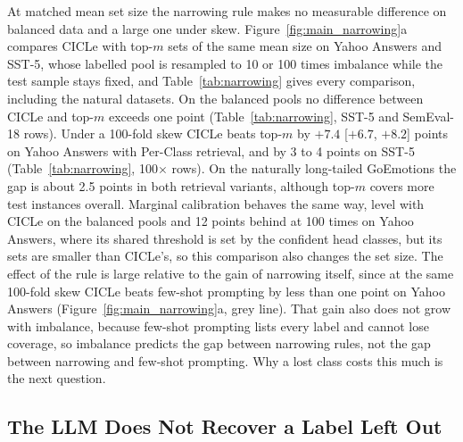 At matched mean set size the narrowing rule makes no measurable difference on balanced data and a large one under skew.
Figure~\ref{fig:main_narrowing}a compares CICLe with top-$m$ sets of the same mean size on Yahoo Answers and SST-5, whose labelled pool is resampled to 10 or 100 times imbalance while the test sample stays fixed, and Table~\ref{tab:narrowing} gives every comparison, including the natural datasets. %
On the balanced pools no difference between CICLe and top-$m$ exceeds one point (Table~\ref{tab:narrowing}, SST-5 and SemEval-18 rows).
Under a 100-fold skew CICLe beats top-$m$ by $+7.4$ [$+6.7$, $+8.2$] points on Yahoo Answers with Per-Class retrieval, and by 3 to 4 points on SST-5 (Table~\ref{tab:narrowing}, 100$\times$ rows).
On the naturally long-tailed GoEmotions the gap is about 2.5 points in both retrieval variants, although top-$m$ covers more test instances overall.
Marginal calibration behaves the same way, level with CICLe on the balanced pools and 12 points behind at 100 times on Yahoo Answers, where its shared threshold is set by the confident head classes, but its sets are smaller than CICLe's, so this comparison also changes the set size. %
The effect of the rule is large relative to the gain of narrowing itself, since at the same 100-fold skew CICLe beats few-shot prompting by less than one point on Yahoo Answers (Figure~\ref{fig:main_narrowing}a, grey line).
That gain also does not grow with imbalance, because few-shot prompting lists every label and cannot lose coverage, so imbalance predicts the gap between narrowing rules, not the gap between narrowing and few-shot prompting.
Why a lost class costs this much is the next question.



\subsection{The LLM Does Not Recover a Label Left Out}
\label{sec:res-consequence}

